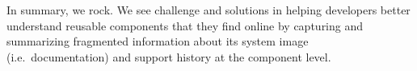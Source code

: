 In summary, we rock.
We see challenge and solutions in helping developers better understand reusable components that they find online by capturing and summarizing fragmented information about its system image (i.e.\ documentation) and support history at the component level.
